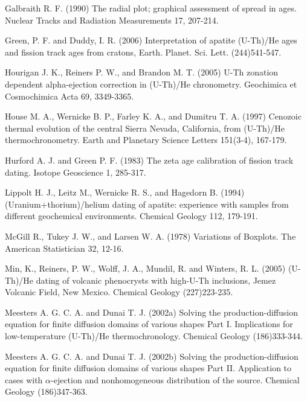 \documentclass{article}
\begin{document}
\begin{description}
\item Galbraith R. F. (1990) The radial plot; graphical assessment of
spread in ages. Nuclear Tracks and Radiation Measurements 17, 207-214.

\item Green, P. F. and Duddy, I. R. (2006) Interpretation of apatite
(U-Th)/He ages and fission track ages from cratons, Earth. Planet. Sci.
Lett. (244)541-547.

\item Hourigan J. K., Reiners P. W., and Brandon M. T. (2005) U-Th
zonation dependent alpha-ejection correction in (U-Th)/He
chronometry. Geochimica et Cosmochimica Acta 69, 3349-3365.

\item House M. A., Wernicke B. P., Farley K. A., and Dumitru
T. A. (1997) Cenozoic thermal evolution of the central Sierra Nevada,
California, from (U-Th)/He thermochronometry. Earth and Planetary
Science Letters 151(3-4), 167-179.

\item Hurford A. J. and Green P. F. (1983) The zeta age calibration
of fission track dating. Isotope Geoscience 1, 285-317.

\item Lippolt H. J., Leitz M., Wernicke R. S., and Hagedorn B.
(1994) (Uranium+thorium)/helium dating of apatite: experience with
samples from different geochemical environments. Chemical Geology
112, 179-191.

\item McGill R., Tukey J. W., and Larsen W. A. (1978) Variations of
Boxplots. The American Statistician 32, 12-16.

\item Min, K., Reiners, P. W., Wolff, J. A., Mundil, R. and Winters, R. L.
(2005) (U-Th)/He dating of volcanic phenocrysts with high-U-Th
inclusions, Jemez Volcanic Field, New Mexico. Chemical Geology (227)223-235.

\item Meesters A. G. C. A. and Dunai T. J. (2002a) Solving the
 production-diffusion equation for finite diffusion domains of
 various shapes Part I. Implications for low-temperature (U-Th)/He
 thermochronology. Chemical Geology (186)333-344.

\item Meesters A. G. C. A. and Dunai T. J. (2002b) Solving the
production-diffusion equation for finite diffusion domains of various
shapes Part II. Application to cases with $\alpha$-ejection and
nonhomogeneous distribution of the source. Chemical Geology (186)347-363.


\end{description}
\end{document}
